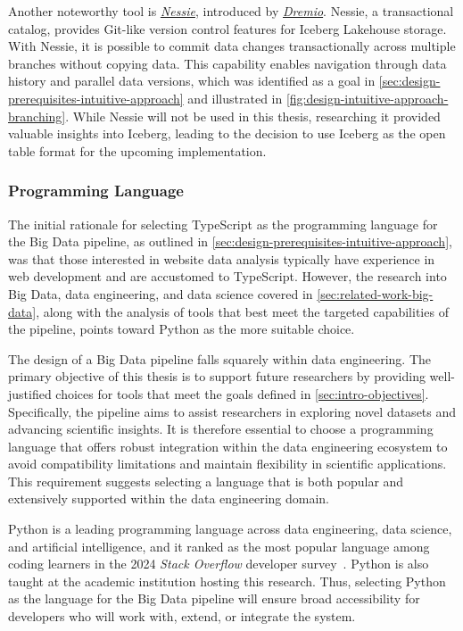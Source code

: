 Another noteworthy tool is \href{https://projectnessie.org/}{\textit{Nessie}}, introduced by \href{https://www.dremio.com/}{\textit{Dremio}}.
Nessie, a transactional catalog, provides Git-like version control features for Iceberg Lakehouse storage.
With Nessie, it is possible to commit data changes transactionally across multiple branches without copying data.
This capability enables navigation through data history and parallel data versions, which was identified as a goal in \cref{sec:design-prerequisites-intuitive-approach} and illustrated in \cref{fig:design-intuitive-approach-branching}.
While Nessie will not be used in this thesis, researching it provided valuable insights into Iceberg, leading to the decision to use Iceberg as the open table format for the upcoming implementation.


\subsubsection{Programming Language}
\label{sec:design-decisions-programming-language}

The initial rationale for selecting TypeScript as the programming language for the Big Data pipeline, as outlined in \cref{sec:design-prerequisites-intuitive-approach}, was that those interested in website data analysis typically have experience in web development and are accustomed to TypeScript.
However, the research into Big Data, data engineering, and data science covered in \cref{sec:related-work-big-data}, along with the analysis of tools that best meet the targeted capabilities of the pipeline, points toward Python as the more suitable choice.

The design of a Big Data pipeline falls squarely within data engineering.
The primary objective of this thesis is to support future researchers by providing well-justified choices for tools that meet the goals defined in \cref{sec:intro-objectives}.
Specifically, the pipeline aims to assist researchers in exploring novel datasets and advancing scientific insights.
It is therefore essential to choose a programming language that offers robust integration within the data engineering ecosystem to avoid compatibility limitations and maintain flexibility in scientific applications.
This requirement suggests selecting a language that is both popular and extensively supported within the data engineering domain.

Python is a leading programming language across data engineering, data science, and artificial intelligence, and it ranked as the most popular language among coding learners in the 2024 \textit{Stack Overflow} developer survey~\cite{StackExchange2024}.
Python is also taught at the academic institution hosting this research.
Thus, selecting Python as the language for the Big Data pipeline will ensure broad accessibility for developers who will work with, extend, or integrate the system.


